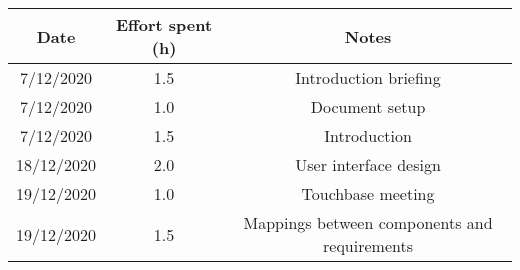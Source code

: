 \documentclass[../../main.tex]{subfiles}
\begin{document}
\begin{center}
    \begin{tabular}{|c| |c| |c|} 
        \hline
        Date & Effort spent (h) & Notes\\ [0.5ex] 
        \hline\hline
        7/12/2020 & 1.5 & Introduction briefing\\ 
        7/12/2020 & 1.0 & Document setup\\
        7/12/2020 & 1.5 & Introduction\\
        18/12/2020 & 2.0 & User interface design\\
        19/12/2020 & 1.0 & Touchbase meeting\\
        19/12/2020 & 1.5 & Mappings between components and requirements\\
        \hline
    \end{tabular}
\end{center}
\end{document}
